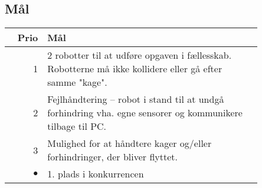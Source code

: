 \subsection{Mål}
\begin{tabular}{r p{0.85\linewidth}}
	\textbf{Prio} & \textbf{Mål} \\
	\hline
	1 & 2 robotter til at udføre opgaven i fællesskab. Robotterne må ikke kollidere eller gå efter samme "kage".\\
	2 & Fejlhåndtering -- robot i stand til at undgå forhindring vha. egne sensorer og kommunikere tilbage til PC.\\
	3 & Mulighed for at håndtere kager og/eller forhindringer, der bliver flyttet. \\
	$\bullet$ & 1. plads i konkurrencen
\end{tabular}